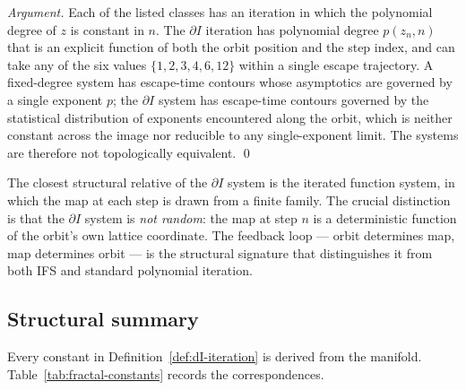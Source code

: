 \documentclass[11pt,a4paper]{article}
\theoremstyle{definition}
\theoremstyle{remark}
\begin{document}
\begin{proof}[Argument]
Each of the listed classes has an iteration in which the polynomial degree of $z$ is constant in $n$. The $\partial I$ iteration has polynomial degree $p(z_{n},n)$ that is an explicit function of both the orbit position and the step index, and can take any of the six values $\{1,2,3,4,6,12\}$ within a single escape trajectory. A fixed-degree system has escape-time contours whose asymptotics are governed by a single exponent $p$; the $\partial I$ system has escape-time contours governed by the statistical distribution of exponents encountered along the orbit, which is neither constant across the image nor reducible to any single-exponent limit. The systems are therefore not topologically equivalent. \qed
\end{proof}

The closest structural relative of the $\partial I$ system is the iterated function system, in which the map at each step is drawn from a finite family. The crucial distinction is that the $\partial I$ system is \emph{not random}: the map at step $n$ is a deterministic function of the orbit's own lattice coordinate. The feedback loop --- orbit determines map, map determines orbit --- is the structural signature that distinguishes it from both IFS and standard polynomial iteration.

\subsection{Structural summary}

Every constant in Definition~\ref{def:dI-iteration} is derived from the manifold. Table~\ref{tab:fractal-constants} records the correspondences.
\end{document}
